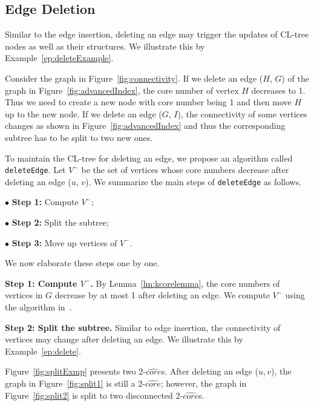 \subsection{Edge Deletion}
\label{sec:edgeDeletion}

Similar to the edge insertion, deleting an edge may trigger the updates of CL-tree nodes as well as their structures. We illustrate this by Example~\ref{ep:deleteExample}.

\begin{example}
\label{ep:deleteExample}
Consider the graph in Figure~\ref{fig:connectivity}. If we delete an edge ($H$, $G$) of the graph in Figure~\ref{fig:advancedIndex}, the core number of vertex $H$ decreases to 1. Thus we need to create a new node with core number being 1 and then move $H$ up to the new node. If we delete an edge ($G$, $I$), the connectivity of some vertices changes as shown in Figure~\ref{fig:advancedIndex} and thus the corresponding subtree has to be split to two new ones.
\end{example}
To maintain the CL-tree for deleting an edge, we propose an algorithm called {\tt deleteEdge}.
Let $V^-$ be the set of vertices whose core numbers decrease after deleting an edge ($u$, $v$).
We summarize the main steps of {\tt deleteEdge} as follows.

$\bullet$ \textbf{Step 1:} Compute $V^-$;

$\bullet$ \textbf{Step 2:} Split the subtree;

$\bullet$ \textbf{Step 3:} Move up vertices of $V^-$.

We now elaborate these steps one by one.

\textbf{Step 1: Compute $V^-$.}
By Lemma~\ref{lm:kcorelemma}, the core numbers of vertices in $G$ decrease by at most 1 after deleting an edge.
We compute $V^-$ using the algorithm in~\cite{kcoreUpdate}.

\textbf{Step 2: Split the subtree.}
Similar to edge insertion, the connectivity of vertices may change after deleting an edge. We illustrate this by Example~\ref{ep:delete}. 

\begin{example}
\label{ep:delete}
Figure~\ref{fig:splitExmp} presents two 2-$\widehat{core}$s. After deleting an edge ($u,v$), the graph in Figure~\ref{fig:split1} is still a 2-$\widehat{core}$; however, the graph in Figure~\ref{fig:split2} is split to two disconnected 2-$\widehat{core}$s.
\end{example}

